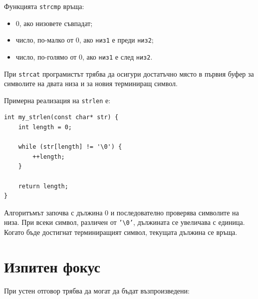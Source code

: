 Функцията \texttt{strcmp} връща:

\begin{itemize}
\item $0$, ако низовете съвпадат;
\item число, по-малко от $0$, ако \texttt{низ1} е преди \texttt{низ2};
\item число, по-голямо от $0$, ако \texttt{низ1} е след \texttt{низ2}.
\end{itemize}

При \texttt{strcat} програмистът трябва да осигури достатъчно място в първия буфер за символите на двата низа и за новия терминиращ символ.

Примерна реализация на \texttt{strlen} е:

\begin{verbatim}
int my_strlen(const char* str) {
    int length = 0;

    while (str[length] != '\0') {
        ++length;
    }

    return length;
}
\end{verbatim}

Алгоритъмът започва с дължина $0$ и последователно проверява символите на низа. При всеки символ, различен от \texttt{'\textbackslash 0'}, дължината се увеличава с единица. Когато бъде достигнат терминиращият символ, текущата дължина се връща.

\section{Изпитен фокус}\label{s:14.8}

При устен отговор трябва да могат да бъдат възпроизведени:

